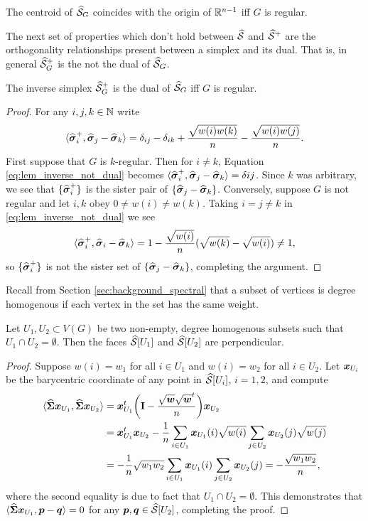 \begin{lemma}
	\label{lem:centroid_normalized}
	The centroid of $\widehat{\mathcal{S}}_G$ coincides with the origin of $\mathbb{R}^{n-1}$ iff $G$ is regular. 
\end{lemma}

The next set of properties which don't hold between $\widehat{\mathcal{S}}$ and $\widehat{\mathcal{S}}^+$ are the orthogonality relationships present between a simplex and its dual. That is, in general $\widehat{\mathcal{S}}^+_G$ is the not the dual of $\widehat{\mathcal{S}}_G$. 

\begin{lemma}
	\label{lem:inverse_not_dual}
	The inverse simplex $\widehat{\mathcal{S}}_G^+$ is the dual of $\widehat{\mathcal{S}}_G$ iff $G$ is regular. 
\end{lemma}
\begin{proof}
	For any $i,j,k\in\mathbb{N}$ write 
	\begin{equation}
	\label{eq:lem_inverse_not_dual}
	\langle \widehat{\vb*{\sigma}}_i^+,\widehat{\vb*{\sigma}}_j-\widehat{\vb*{\sigma}}_k\rangle = \delta_{ij} - \delta_{ik} + \frac{\sqrt{w(i)w(k)}}{n} - \frac{\sqrt{w(i)w(j)}}{n}.
	\end{equation}
	First suppose that $G$ is $k$-regular. Then for $i\neq k$, Equation \eqref{eq:lem_inverse_not_dual} becomes $\langle \widehat{\vb*{\sigma}}_i^+,\widehat{\vb*{\sigma}}_j-\widehat{\vb*{\sigma}}_k\rangle = \delta{ij}$. Since $k$ was arbitrary, we see that $\{\widehat{\vb*{\sigma}}_i^+\}$ is the sister pair of $\{\widehat{\vb*{\sigma}}_j-\widehat{\vb*{\sigma}}_k\}$. Conversely, suppose $G$ is not regular and let $i,k$ obey $0\neq w(i)\neq w(k)$. Taking $i=j\neq k$ in \eqref{eq:lem_inverse_not_dual} we see 
	\[\langle \widehat{\vb*{\sigma}}_i^+,\widehat{\vb*{\sigma}}_i-\widehat{\vb*{\sigma}}_k\rangle = 1 - \frac{\sqrt{w(i)}}{n}(\sqrt{w(k)}-\sqrt{w(i)})\neq 1,\]
	so $\{\widehat{\vb*{\sigma}}_i^+\}$ is not the sister set of $\{\widehat{\vb*{\sigma}}_j-\widehat{\vb*{\sigma}}_k\}$, completing the argument. 
\end{proof}


Recall from Section \ref{sec:background_spectral} that a subset of vertices is degree homogenous if each vertex in the set has the same weight. 

\begin{lemma}
	Let $U_1,U_2\subset V(G)$ be two non-empty, degree homogenous subsets such that $U_1\cap U_2=\emptyset$. Then the faces $\widehat{\mathcal{S}}[U_1]$ and $\widehat{\mathcal{S}}[U_2]$ are perpendicular. 
\end{lemma}
\begin{proof}
	Suppose $w(i)=w_1$ for all $i\in U_1$ and $w(i)=w_2$ for all $i\in U_2$. Let $\vb*{x}_{U_i}$ be the barycentric coordinate of any point in $\widehat{\mathcal{S}}[U_i]$, $i=1,2$, and compute 
	\begin{align*}
	\langle \widehat{\boldsymbol{\Sigma}}\vb*{x}_{U_1},\widehat{\boldsymbol{\Sigma}}\vb*{x}_{U_2}\rangle &= \vb*{x}_{U_1}^t \bigg(\vb{I}-\frac{\sqrt{\vb*{w}}\sqrt{\vb*{w}}^t}{n}\bigg) \vb*{x}_{U_2}\\
	&= \vb*{x}_{U_1}^t\vb*{x}_{U_2} - \frac{1}{n}\sum_{i\in U_1}\vb*{x}_{U_1}(i)\sqrt{w(i)}\sum_{j\in U_2}\vb*{x}_{U_2}(j) \sqrt{w(j)} \\
	&= -\frac{1}{n}\sqrt{w_1w_2}\sum_{i\in U_1}\vb*{x}_{U_1}(i) \sum_{j\in U_2}\vb*{x}_{U_2}(j) = -\frac{\sqrt{w_1w_2}}{n},
	\end{align*} 
	where the second equality is due to fact that $U_1\cap U_2=\emptyset$. This demonstrates that $\langle \widehat{\boldsymbol{\Sigma}}\vb*{x}_{U_1},\vb*{p}-\vb*{q}\rangle=0$ for any $\vb*{p},\vb*{q}\in\widehat{\mathcal{S}}[U_2]$, completing the proof. 
\end{proof}

